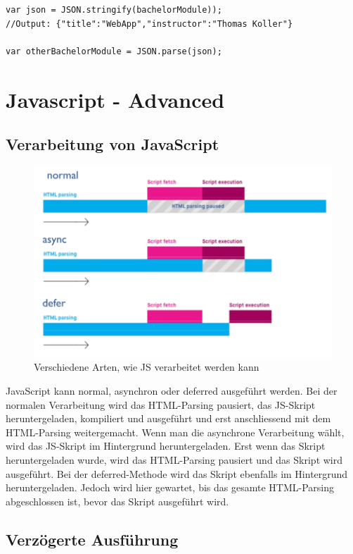 \documentclass[a4paper, 11pt]{article}
\begin{document}
\begin{lstlisting}
var json = JSON.stringify(bachelorModule));
//Output: {"title":"WebApp","instructor":"Thomas Koller"}

var otherBachelorModule = JSON.parse(json);
\end{lstlisting}

\newpage

\section{Javascript - Advanced}
\subsection{Verarbeitung von JavaScript}
\begin{figure}
	\centering
	\includegraphics[keepaspectratio=true,height=15\baselineskip]{js_ausfuehrung.jpg}
	\caption{Verschiedene Arten, wie JS verarbeitet werden kann}
	\label{fig:rel}
\end{figure}
JavaScript kann normal, asynchron oder deferred ausgeführt werden. Bei der normalen Verarbeitung wird das HTML-Parsing pausiert, das JS-Skript heruntergeladen, kompiliert und ausgeführt und erst anschliessend mit dem HTML-Parsing weitergemacht. Wenn man die asynchrone Verarbeitung wählt, wird das JS-Skript im Hintergrund heruntergeladen. Erst wenn das Skript heruntergeladen wurde, wird das HTML-Parsing pausiert und das Skript wird ausgeführt. Bei der deferred-Methode wird das Skript ebenfalls im Hintergrund heruntergeladen. Jedoch wird hier gewartet, bis das gesamte HTML-Parsing abgeschlossen ist, bevor das Skript ausgeführt wird.

\subsection{Verzögerte Ausführung}
\end{document}
